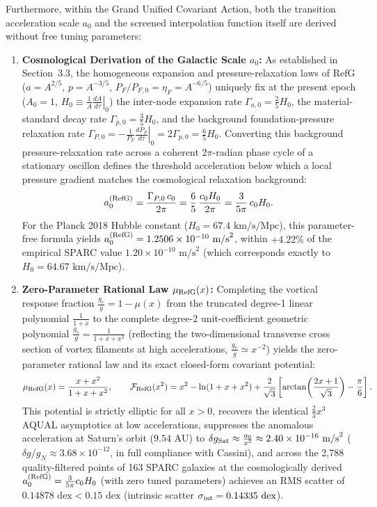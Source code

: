 \documentclass[11pt,a4paper]{article}
\newcommand{\RefG}{\mathrm{RefG}}
\begin{document}
Furthermore, within the Grand Unified Covariant Action, both the transition acceleration scale $a_0$ and the screened interpolation function itself are derived without free tuning parameters:
\begin{enumerate}[label=\arabic*.]
\item \textbf{Cosmological Derivation of the Galactic Scale $a_0$:} As established in Section~3.3, the homogeneous expansion and pressure-relaxation laws of $\RefG$ ($a = A^{2/5}$, $p = A^{-3/5}$, $P_F/P_{F,0} = \eta_F = A^{-6/5}$) uniquely fix at the present epoch ($A_0 = 1$, $H_0 \equiv \left.\frac{1}{A}\frac{dA}{d\tau}\right|_0$) the inter-node expansion rate $\Gamma_{a,0} = \frac{2}{5}H_0$, the material-standard decay rate $\Gamma_{p,0} = \frac{3}{5}H_0$, and the background foundation-pressure relaxation rate $\Gamma_{P,0} = -\left.\frac{1}{P_F}\frac{dP_F}{d\tau}\right|_0 = 2\Gamma_{p,0} = \frac{6}{5}H_0$. Converting this background pressure-relaxation rate across a coherent $2\pi$-radian phase cycle of a stationary oscillon defines the threshold acceleration below which a local pressure gradient matches the cosmological relaxation background:
\begin{equation}
a_0^{\rm (RefG)} = \frac{\Gamma_{P,0}\,c_0}{2\pi} = \frac{6}{5}\,\frac{c_0 H_0}{2\pi} = \frac{3}{5\pi}\,c_0 H_0.
\end{equation}
For the Planck 2018 Hubble constant ($H_0 = 67.4\text{ km/s/Mpc}$), this parameter-free formula yields $a_0^{\rm (RefG)} = 1.2506\times 10^{-10}\text{ m/s}^2$, within $+4.22\%$ of the empirical SPARC value $1.20\times 10^{-10}\text{ m/s}^2$ (which corresponds exactly to $H_0 = 64.67\text{ km/s/Mpc}$).
\item \textbf{Zero-Parameter Rational Law $\mu_{\rm RefG}(x)$:} Completing the vortical response fraction $\frac{g_v}{g} = 1 - \mu(x)$ from the truncated degree-1 linear polynomial $\frac{1}{1+x}$ to the complete degree-2 unit-coefficient geometric polynomial $\frac{g_v}{g} = \frac{1}{1 + x + x^2}$ (reflecting the two-dimensional transverse cross section of vortex filaments at high accelerations, $\frac{g_v}{g} \simeq x^{-2}$) yields the zero-parameter rational law and its exact closed-form covariant potential:
\begin{equation}
\mu_{\rm RefG}(x) = \frac{x + x^2}{1 + x + x^2}, \qquad \mathcal{F}_{\rm RefG}(x^2) = x^2 - \ln(1 + x + x^2) + \frac{2}{\sqrt{3}}\left[\arctan\!\left(\frac{2x+1}{\sqrt{3}}\right) - \frac{\pi}{6}\right].
\end{equation}
This potential is strictly elliptic for all $x > 0$, recovers the identical $\frac{2}{3}x^3$ AQUAL asymptotics at low accelerations, suppresses the anomalous acceleration at Saturn's orbit ($9.54\text{ AU}$) to $\delta g_{\rm Sat} \approx \frac{a_0}{x^2} \approx 2.40\times 10^{-16}\text{ m/s}^2$ ($\delta g/g_N \approx 3.68\times 10^{-12}$, in full compliance with Cassini), and across the 2,788 quality-filtered points of 163 SPARC galaxies at the cosmologically derived $a_0^{\rm (RefG)} = \frac{3}{5\pi}c_0 H_0$ (with zero tuned parameters) achieves an RMS scatter of $0.14878\text{ dex} < 0.15\text{ dex}$ (intrinsic scatter $\sigma_{\rm int} = 0.14335\text{ dex}$).
\end{enumerate}
\end{document}
